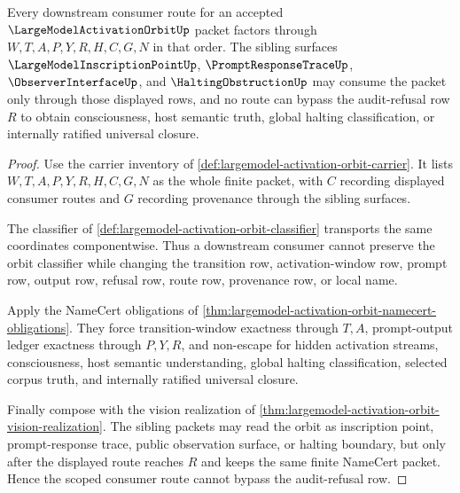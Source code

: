 \begin{theorem}
\label{thm:largemodel-activation-orbit-scoped-consumer-route}
Every downstream consumer route for an accepted $\LargeModelActivationOrbitUp$ packet factors through $W,T,A,P,Y,R,H,C,G,N$ in that order. The sibling surfaces $\LargeModelInscriptionPointUp$, $\PromptResponseTraceUp$, $\ObserverInterfaceUp$, and $\HaltingObstructionUp$ may consume the packet only through those displayed rows, and no route can bypass the audit-refusal row $R$ to obtain consciousness, host semantic truth, global halting classification, or internally ratified universal closure.
\end{theorem}
\begin{proof}
Use the carrier inventory of \autoref{def:largemodel-activation-orbit-carrier}. It lists $W,T,A,P,Y,R,H,C,G,N$ as the whole finite packet, with $C$ recording displayed consumer routes and $G$ recording provenance through the sibling surfaces.

The classifier of \autoref{def:largemodel-activation-orbit-classifier} transports the same coordinates componentwise. Thus a downstream consumer cannot preserve the orbit classifier while changing the transition row, activation-window row, prompt row, output row, refusal row, route row, provenance row, or local name.

Apply the NameCert obligations of \autoref{thm:largemodel-activation-orbit-namecert-obligations}. They force transition-window exactness through $T,A$, prompt-output ledger exactness through $P,Y,R$, and non-escape for hidden activation streams, consciousness, host semantic understanding, global halting classification, selected corpus truth, and internally ratified universal closure.

Finally compose with the vision realization of \autoref{thm:largemodel-activation-orbit-vision-realization}. The sibling packets may read the orbit as inscription point, prompt-response trace, public observation surface, or halting boundary, but only after the displayed route reaches $R$ and keeps the same finite NameCert packet. Hence the scoped consumer route cannot bypass the audit-refusal row.
\end{proof}



